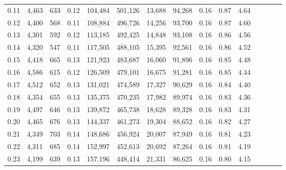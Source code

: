 \begin{tabular}{rrrcrrrrrrrrrrr}
0.11 &   4,463 &     633 &                                       0.12 &  104,484 &  501,126 &   13,688 &  94,268 &  0.16 &  0.87 &                         4.64 \\
0.12 &   4,400 &     568 &                                       0.11 &  108,884 &  496,726 &   14,256 &  93,700 &  0.16 &  0.87 &                         4.60 \\
0.13 &   4,301 &     592 &                                       0.12 &  113,185 &  492,425 &   14,848 &  93,108 &  0.16 &  0.86 &                         4.56 \\
0.14 &   4,320 &     547 &                                       0.11 &  117,505 &  488,105 &   15,395 &  92,561 &  0.16 &  0.86 &                         4.52 \\
0.15 &   4,418 &     665 &                                       0.13 &  121,923 &  483,687 &   16,060 &  91,896 &  0.16 &  0.85 &                         4.48 \\
0.16 &   4,586 &     615 &                                       0.12 &  126,509 &  479,101 &   16,675 &  91,281 &  0.16 &  0.85 &                         4.44 \\
0.17 &   4,512 &     652 &                                       0.13 &  131,021 &  474,589 &   17,327 &  90,629 &  0.16 &  0.84 &                         4.40 \\
0.18 &   4,354 &     655 &                                       0.13 &  135,375 &  470,235 &   17,982 &  89,974 &  0.16 &  0.83 &                         4.36 \\
0.19 &   4,497 &     646 &                                       0.13 &  139,872 &  465,738 &   18,628 &  89,328 &  0.16 &  0.83 &                         4.31 \\
0.20 &   4,465 &     676 &                                       0.13 &  144,337 &  461,273 &   19,304 &  88,652 &  0.16 &  0.82 &                         4.27 \\
0.21 &   4,349 &     703 &                                       0.14 &  148,686 &  456,924 &   20,007 &  87,949 &  0.16 &  0.81 &                         4.23 \\
0.22 &   4,311 &     685 &                                       0.14 &  152,997 &  452,613 &   20,692 &  87,264 &  0.16 &  0.81 &                         4.19 \\
0.23 &   4,199 &     639 &                                       0.13 &  157,196 &  448,414 &   21,331 &  86,625 &  0.16 &  0.80 &                         4.15 \\

\end{tabular}
